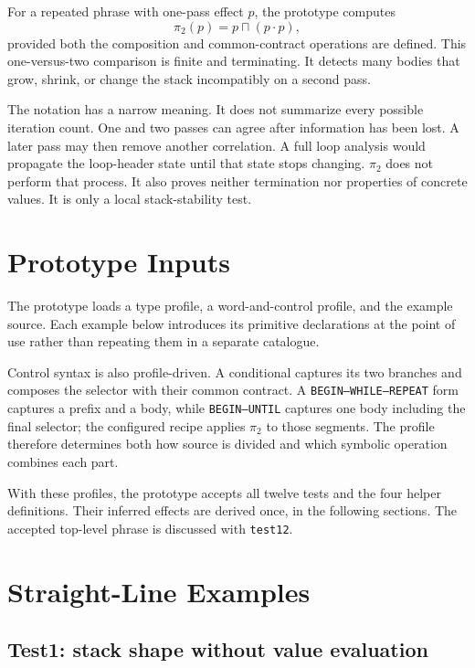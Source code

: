 \documentclass[11pt,a4paper]{article}
\newcommand{\meet}{\mathbin{\sqcap}}
\newcommand{\seq}{\mathbin{\cdot}}
\begin{document}
For a repeated phrase with one-pass effect $p$, the prototype computes
\[
                  \pi_2(p)=p\meet(p\seq p),
\]
provided both the composition and common-contract operations are defined.
This one-versus-two comparison is finite and terminating.  It detects many
bodies that grow, shrink, or change the stack incompatibly on a second pass.

The notation has a narrow meaning.  It does not summarize every possible
iteration count.  One and two passes can agree after information has been
lost.  A later pass may then remove another correlation.  A full loop analysis
would propagate the loop-header state until that state stops changing.
$\pi_2$ does not perform that process.  It also proves neither termination nor
properties of concrete values.  It is only a local stack-stability test.

\section{Prototype Inputs}
\label{sec:control}

The prototype loads a type profile, a word-and-control profile, and the
example source.  Each example below introduces its primitive declarations at
the point of use rather than repeating them in a separate catalogue.

Control syntax is also profile-driven.  A conditional captures its two
branches and composes the selector with their common contract.  A
\texttt{BEGIN--WHILE--REPEAT} form captures a prefix and a body, while
\texttt{BEGIN--UNTIL} captures one body including the
final selector; the configured recipe applies $\pi_2$ to those segments.  The
profile therefore determines both how source is divided and which symbolic
operation combines each part.

With these profiles, the prototype accepts all twelve tests and the four
helper definitions.  Their inferred effects are derived once, in the following
sections.  The accepted top-level phrase is discussed with \texttt{test12}.

\section{Straight-Line Examples}
\label{sec:sequence-examples}

\subsection{Test1: stack shape without value evaluation}
\end{document}
